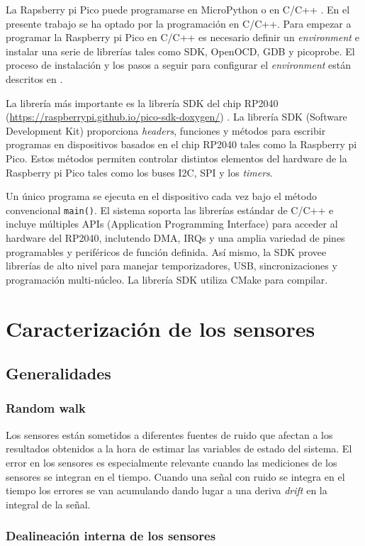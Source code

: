 \documentclass[a4paper,12pt]{book}
\begin{document}
La Rapsberry pi Pico puede programarse en MicroPython \cite{micropython-raspberrypiPico} o en C/C++ \cite{c/c++-raspberrypiPicot}. En el presente trabajo se ha optado por la programación en C/C++. Para empezar a programar la Raspberry pi Pico en C/C++ es necesario definir un \emph{environment} e instalar una serie de librerías tales como SDK, OpenOCD, GDB y picoprobe. El proceso de instalación y los pasos a seguir para configurar el \emph{environment} están descritos en \cite{c/c++-raspberrypiPicot}.


La librería más importante es la librería SDK del chip RP2040 (\url{https://raspberrypi.github.io/pico-sdk-doxygen/}) \cite{c/c++-raspberrypiPicot, sdk-raspberrypiPico}. La librería SDK (Software Development Kit) proporciona \emph{headers}, funciones y métodos para escribir programas en dispositivos basados en el chip RP2040 tales como la Raspberry pi Pico. Estos métodos permiten controlar distintos elementos del hardware de la Raspberry pi Pico tales como los buses I2C, SPI y los \emph{timers}.

Un único programa se ejecuta en el dispositivo cada vez bajo el método convencional \texttt{main()}. El sistema soporta las librerías estándar de C/C++ e incluye múltiples APIs (Application Programming Interface) para acceder al hardware del RP2040, inclutendo DMA, IRQs y una amplia variedad de pines programables y periféricos de función definida. Así mismo, la SDK provee librerías de alto nivel para manejar temporizadores, USB, sincronizaciones y programación multi-núcleo. La librería SDK utiliza CMake para compilar.



\chapter{Caracterización de los sensores}\label{chapter:calibration}

{\color{red}
\section{Generalidades}

\subsection{Random walk}

Los sensores están sometidos a diferentes fuentes de ruido que afectan a los resultados obtenidos a la hora de estimar las variables de estado del sistema. El error en los sensores es especialmente relevante cuando las mediciones de los sensores se integran en el tiempo. Cuando una señal con ruido se integra en el tiempo los errores se van acumulando dando lugar a una deriva \emph{drift} en la integral de la señal. 

\subsection{Dealineación interna de los sensores}

}
\end{document}
